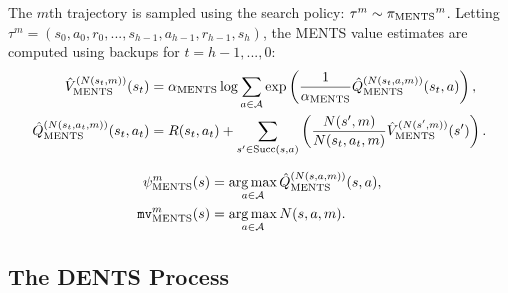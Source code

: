         The $m$th trajectory is sampled using the search policy: $\tau^m \sim {\pi_{{\textnormal{MENTS}}}}^m$. Letting $\tau^m=(s_0,a_0,r_0,...,s_{h-1},a_{h-1},r_{h-1},s_{h})$, the MENTS value estimates are computed using backups for $t=h-1, ..., 0$: 
        \begin{align}
            {\hat{V}^{(N(s_t,m))}_{{\textnormal{MENTS}}}}(s_t) &= 
                {\alpha_{{\textnormal{MENTS}}}} \log \sum_{a\in\mathcal{A}} \exp \left(
                    \frac{1}{{\alpha_{{\textnormal{MENTS}}}}}{\hat{Q}^{(N(s_t,a,m))}_{{\textnormal{MENTS}}}}(s_t,a) \right), \label{appeq:soft_v_backup} \\
            {\hat{Q}^{(N(s_t,a_t,m))}_{{\textnormal{MENTS}}}}(s_t,a_t) &= 
                R(s_t,a_t) + \sum_{s'\in{\textnormal{Succ}(s,a)}} \left( 
                    \frac{N(s',m)}{N(s_t,a_t,m)} {\hat{V}^{(N(s',m))}_{{\textnormal{MENTS}}}}(s') \right). \label{appeq:soft_q_backup}
        \end{align}


        \begin{align}
            \psi^{m}_{{\textnormal{MENTS}}}(s) &= \operatorname*{arg\,max}_{a\in\mathcal{A}}{\hat{Q}^{(N(s,a,m))}_{{\textnormal{MENTS}}}}(s,a), \\
            {\texttt{mv}^{m}_{{\textnormal{MENTS}}}}(s) &= \operatorname*{arg\,max}_{a\in\mathcal{A}} N(s,a,m).
        \end{align}





    \subsection{The DENTS Process}


